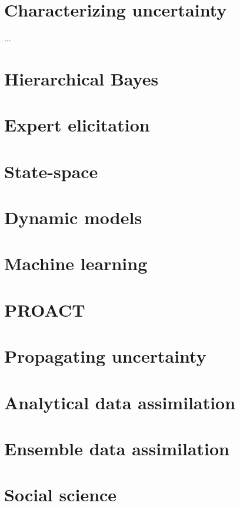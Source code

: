 \documentclass[12pt, oneside]{article}   	%
\begin{document}
 

\tableofcontents

\clearpage

\section{Characterizing uncertainty}

...

\section{Hierarchical Bayes}

\section{Expert elicitation}

\section{State-space}

\section{Dynamic models}

\section{Machine learning}

\section{PROACT}

\section{Propagating uncertainty}

\section{Analytical data assimilation}

\section{Ensemble data assimilation}

\section{Social science}
\end{document}
